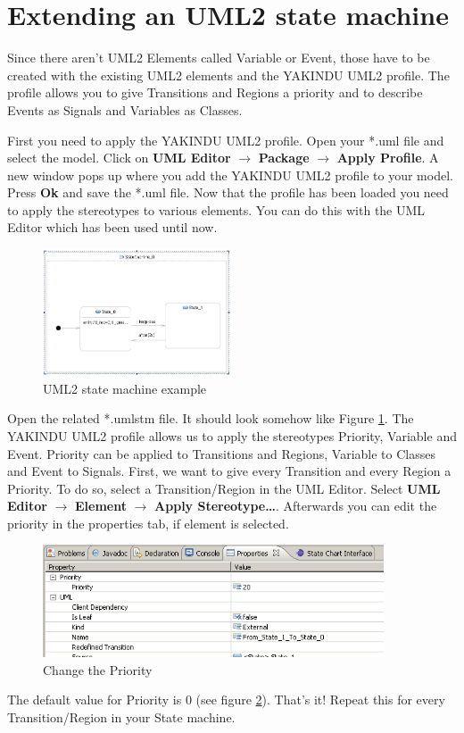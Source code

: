 \section{Extending an UML2 state machine}
Since there aren't UML2 Elements called Variable or Event, those have to be
created with the existing UML2 elements and the YAKINDU UML2 profile. The profile
allows you to give Transitions and Regions a priority and to describe Events as
Signals and Variables as Classes.

First you need to apply the YAKINDU UML2 profile.  Open your *.uml file and select the model.
Click on \textbf{UML Editor} $\rightarrow$ \textbf{Package} $\rightarrow$
\textbf{Apply Profile}. A new window pops up where you add the YAKINDU UML2
profile to your model. Press \textbf{Ok} and save the *.uml file. Now that the
profile has been loaded you need to apply the stereotypes to various elements.
You can do this with the UML Editor which has been used until now.
\begin{figure}[h!]
\center
\includegraphics[width=0.5\textwidth]{Pictures/priorityVisualisation}
\caption{\label{fig:priorityVisualisation}UML2 state machine example} 
\end{figure}

Open the related *.umlstm file. It should look somehow like Figure
\ref{fig:priorityVisualisation}. The YAKINDU UML2 profile allows us to apply the
stereotypes Priority, Variable and Event. Priority can be applied to Transitions
and Regions, Variable to Classes and Event to Signals. First, we want to give
every Transition and every Region a Priority. To do so, select a
Transition/Region in the UML Editor. Select \textbf{UML Editor} $\rightarrow$ \textbf{Element} $\rightarrow$
\textbf{Apply Stereotype\dots}. Afterwards you can edit the priority in the properties tab, if element is selected.
\begin{figure}[h!] \center
\includegraphics[width=0.9\textwidth]{Pictures/changePriority}
\caption{\label{fig:changePriority}Change the Priority} 
\end{figure}
The default value for Priority is 0 (see figure
\ref{fig:changePriority}). That's it! Repeat this for every Transition/Region in
your State machine.

